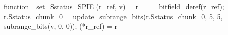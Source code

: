 function _set_Sstatus_SPIE (r_ref, v) = {
    r = __bitfield_deref(r_ref);
    r.Sstatus_chunk_0 = update_subrange_bits(r.Sstatus_chunk_0, 5, 5, subrange_bits(v, 0, 0));
    (*r_ref) = r
}
